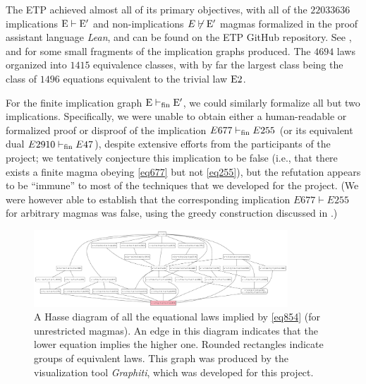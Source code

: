 The ETP achieved almost all of its primary objectives, with all of the $\num{22033636}$ implications ${\mathrm{E}} \vdash {\mathrm{E}'}$ and non-implications $E \not \vdash {\mathrm{E}'}$ magmas formalized in the proof assistant language \emph{Lean}, and can be found on the ETP GitHub repository.  See ,  and  for some small fragments of the implication graphs produced.
The $\num{4694}$ laws organized into $\num{1415}$ equivalence classes, with by far the largest class being the class of $\num{1496}$ equations equivalent to the trivial law $\mathrm{E}2$.

For the finite implication graph ${\mathrm{E}} \vdash_{\mathrm{fin}} {\mathrm{E}'}$, we could similarly formalize all but two implications.  Specifically, we were unable to obtain either a human-readable or formalized proof or disproof of the implication $E677 \vdash_{\mathrm{fin}} E255$ (or its equivalent dual $E2910 \vdash_{\mathrm{fin}} E47$), despite extensive efforts from the participants of the project; we tentatively conjecture this implication to be false (i.e., that there exists a finite magma obeying \eqref{eq677} but not \eqref{eq255}), but the refutation appears to be ``immune'' to most of the techniques that we developed for the project.  (We were however able to establish that the corresponding implication $E677 \vdash E255$ for arbitrary magmas was false, using the greedy construction discussed in .)

\begin{figure}
\centering
\includegraphics[width=0.85\textwidth]{854.png}
\caption{A Hasse diagram of all the equational laws implied by \eqref{eq854} (for unrestricted magmas).  An edge in this diagram indicates that the lower equation implies the higher one. Rounded rectangles indicate groups of equivalent laws.  This graph was produced by the visualization tool \emph{Graphiti}, which was developed for this project.}
\label{fig:854}
\end{figure}

